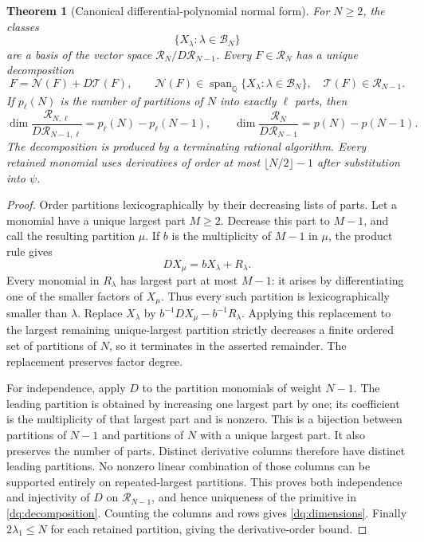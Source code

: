 \documentclass[11pt,a4paper]{article}
\numberwithin{equation}{section}
\theoremstyle{plain}
\newtheorem{theorem}{Theorem}[section]
\theoremstyle{definition}
\theoremstyle{remark}
\begin{document}
\begin{theorem}[Canonical differential-polynomial normal form]
\label{dq:normalform}
For $N\ge2$, the classes
\[
 \{X_\lambda:\lambda\in\mathscr B_N\}
\]
are a basis of the vector space $\mathscr R_N/D\mathscr R_{N-1}$.
Every $F\in\mathscr R_N$ has a unique decomposition
\begin{equation}\label{dq:decomposition}
 F=\mathcal N(F)+D\mathcal T(F),\qquad
 \mathcal N(F)\in\operatorname{span}_{\mathbb Q}
                 \{X_\lambda:\lambda\in\mathscr B_N\},
 \quad\mathcal T(F)\in\mathscr R_{N-1}.
\end{equation}
If $p_\ell(N)$ is the number of partitions of $N$ into exactly
$\ell$ parts, then
\begin{equation}\label{dq:dimensions}
 \dim \frac{\mathscr R_{N,\ell}}{D\mathscr R_{N-1,\ell}}
   =p_\ell(N)-p_\ell(N-1),\qquad
 \dim \frac{\mathscr R_N}{D\mathscr R_{N-1}}
   =p(N)-p(N-1).
\end{equation}
The decomposition is produced by a terminating rational algorithm.
Every retained monomial uses derivatives of order at most
$\lfloor N/2\rfloor-1$ after substitution into $\psi$.
\end{theorem}

\begin{proof}
Order partitions lexicographically by their decreasing lists of parts.
Let a monomial have a unique largest part $M\ge2$. Decrease this
part to $M-1$, and call the resulting partition $\mu$. If $b$ is
the multiplicity of $M-1$ in $\mu$, the product rule gives
\begin{equation}\label{dq:pivot}
 D X_\mu=bX_\lambda+R_\lambda.
\end{equation}
Every monomial in $R_\lambda$ has largest part at most $M-1$:
it arises by differentiating one of the smaller factors of $X_\mu$.
Thus every such partition is lexicographically smaller than $\lambda$.
Replace $X_\lambda$ by $b^{-1}DX_\mu-b^{-1}R_\lambda$.
Applying this replacement to the largest remaining unique-largest
partition strictly decreases a finite ordered set of partitions of $N$,
so it terminates in the asserted remainder. The replacement preserves
factor degree.

For independence, apply $D$ to the partition monomials of weight $N-1$.
The leading partition is obtained by increasing one largest part by one;
its coefficient is the multiplicity of that largest part and is nonzero.
This is a bijection between partitions of $N-1$ and partitions of $N$
with a unique largest part. It also preserves the number of parts.
Distinct derivative columns therefore have distinct leading partitions.
No nonzero linear combination of those columns can be supported entirely
on repeated-largest partitions. This proves both independence and
injectivity of $D$ on $\mathscr R_{N-1}$, and hence uniqueness of
the primitive in \eqref{dq:decomposition}. Counting the columns and
rows gives \eqref{dq:dimensions}. Finally $2\lambda_1\le N$ for
each retained partition, giving the derivative-order bound.
\end{proof}
\end{document}
